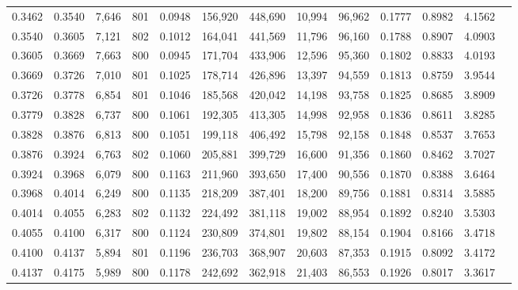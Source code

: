 \begin{tabular}{rrrrrrrrrrrrr}
0.3462 & 0.3540 &  7,646 & 801 &                                     0.0948 & 156,920 & 448,690 &  10,994 &  96,962 & 0.1777 & 0.8982 & 4.1562 \\
0.3540 & 0.3605 &  7,121 & 802 &                                     0.1012 & 164,041 & 441,569 &  11,796 &  96,160 & 0.1788 & 0.8907 & 4.0903 \\
0.3605 & 0.3669 &  7,663 & 800 &                                     0.0945 & 171,704 & 433,906 &  12,596 &  95,360 & 0.1802 & 0.8833 & 4.0193 \\
0.3669 & 0.3726 &  7,010 & 801 &                                     0.1025 & 178,714 & 426,896 &  13,397 &  94,559 & 0.1813 & 0.8759 & 3.9544 \\
0.3726 & 0.3778 &  6,854 & 801 &                                     0.1046 & 185,568 & 420,042 &  14,198 &  93,758 & 0.1825 & 0.8685 & 3.8909 \\
0.3779 & 0.3828 &  6,737 & 800 &                                     0.1061 & 192,305 & 413,305 &  14,998 &  92,958 & 0.1836 & 0.8611 & 3.8285 \\
0.3828 & 0.3876 &  6,813 & 800 &                                     0.1051 & 199,118 & 406,492 &  15,798 &  92,158 & 0.1848 & 0.8537 & 3.7653 \\
0.3876 & 0.3924 &  6,763 & 802 &                                     0.1060 & 205,881 & 399,729 &  16,600 &  91,356 & 0.1860 & 0.8462 & 3.7027 \\
0.3924 & 0.3968 &  6,079 & 800 &                                     0.1163 & 211,960 & 393,650 &  17,400 &  90,556 & 0.1870 & 0.8388 & 3.6464 \\
0.3968 & 0.4014 &  6,249 & 800 &                                     0.1135 & 218,209 & 387,401 &  18,200 &  89,756 & 0.1881 & 0.8314 & 3.5885 \\
0.4014 & 0.4055 &  6,283 & 802 &                                     0.1132 & 224,492 & 381,118 &  19,002 &  88,954 & 0.1892 & 0.8240 & 3.5303 \\
0.4055 & 0.4100 &  6,317 & 800 &                                     0.1124 & 230,809 & 374,801 &  19,802 &  88,154 & 0.1904 & 0.8166 & 3.4718 \\
0.4100 & 0.4137 &  5,894 & 801 &                                     0.1196 & 236,703 & 368,907 &  20,603 &  87,353 & 0.1915 & 0.8092 & 3.4172 \\
0.4137 & 0.4175 &  5,989 & 800 &                                     0.1178 & 242,692 & 362,918 &  21,403 &  86,553 & 0.1926 & 0.8017 & 3.3617 \\

\end{tabular}
